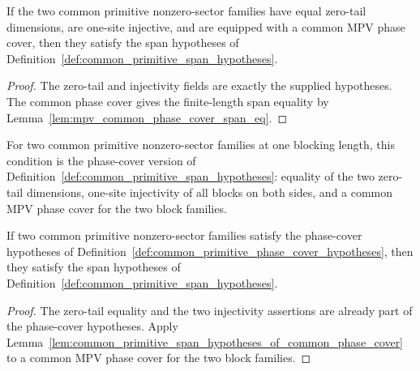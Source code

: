 \begin{lemma}%
\label{lem:common_primitive_span_hypotheses_of_common_phase_cover}
	\leanok
	If the two common primitive nonzero-sector families have equal zero-tail
	dimensions, are one-site injective, and are equipped with a common MPV phase cover, then
	they satisfy the span hypotheses of
	Definition~\ref{def:common_primitive_span_hypotheses}.
\end{lemma}

\begin{proof}
	\leanok
	The zero-tail and injectivity fields are exactly the supplied hypotheses.  The
	common phase cover gives the finite-length span equality by
	Lemma~\ref{lem:mpv_common_phase_cover_span_eq}.
\end{proof}

\begin{definition}%
\label{def:common_primitive_phase_cover_hypotheses}
	\leanok
	For two common primitive nonzero-sector families at one blocking length, this
	condition is the phase-cover version of
	Definition~\ref{def:common_primitive_span_hypotheses}: equality of the two
	zero-tail dimensions, one-site injectivity of all blocks on both sides, and a
	common MPV phase cover for the two block families.
\end{definition}

\begin{lemma}%
\label{lem:common_primitive_phase_cover_hypotheses_to_span_hypotheses}
	\leanok
	If two common primitive nonzero-sector families satisfy the phase-cover
	hypotheses of
	Definition~\ref{def:common_primitive_phase_cover_hypotheses}, then they
	satisfy the span hypotheses of
	Definition~\ref{def:common_primitive_span_hypotheses}.
\end{lemma}

\begin{proof}
	\leanok
	The zero-tail equality and the two injectivity assertions are already part of
	the phase-cover hypotheses.  Apply
	Lemma~\ref{lem:common_primitive_span_hypotheses_of_common_phase_cover} to a
	common MPV phase cover for the two block families.
\end{proof}

